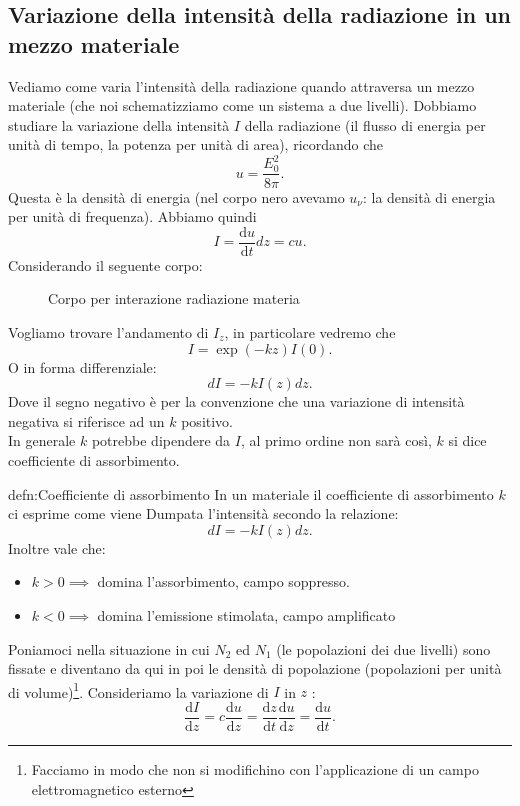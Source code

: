 \subsection{Variazione della intensità della radiazione in un mezzo materiale}%
Vediamo come varia l'intensità della radiazione quando attraversa un mezzo materiale (che noi schematizziamo come un sistema a due livelli). Dobbiamo studiare la variazione della intensità $I$  della radiazione (il flusso di energia per unità di tempo, la potenza per unità di area), ricordando che
\[
u = \frac{E_0^2}{8\pi}
.\] 
Questa è la densità di energia (nel corpo nero avevamo $u_\nu$: la densità di energia per unità di frequenza). Abbiamo quindi
\[
I= \frac{\text{d} u}{\text{d} t} dz =  cu
.\] 
Considerando il seguente corpo:
\begin{figure}[H]
    \centering
    \caption{Corpo per interazione radiazione materia}
    \label{fig:corpo-per-interazione-radiazione-materia}
\end{figure}
\noindent
Vogliamo trovare l'andamento di $I_z$, in particolare vedremo che
\[
    I=\exp\left(-kz\right)I(0) 
.\] 
O in forma differenziale:
\[
    dI = -k I(z)dz
.\] 
Dove il segno negativo è per la convenzione che una variazione di intensità negativa si riferisce ad un $k$  positivo.\\
In generale $k$  potrebbe dipendere da $I$, al primo ordine non sarà così, $k$  si dice coefficiente di assorbimento.
\begin{defn}{defn:Coefficiente di assorbimento}
In un materiale il coefficiente di assorbimento $k$ ci esprime come viene Dumpata l'intensità secondo la relazione:
\[
    dI=-kI(z) dz
.\] 
Inoltre vale che:
\begin{itemize}
    \item $k>0\implies$ domina l'assorbimento, campo soppresso.
    \item $k<0\implies$ domina l'emissione stimolata, campo amplificato
\end{itemize}
\end{defn}
Poniamoci nella situazione in cui $N_2$  ed $N_1$  (le popolazioni dei due livelli) sono fissate e diventano da qui in poi le densità di popolazione (popolazioni per unità di volume)\footnote{Facciamo in modo che non si modifichino con l'applicazione di un campo elettromagnetico esterno}.
Consideriamo la variazione di $I$  in $z$  :
\[
\frac{\text{d} I}{\text{d} z} = c \frac{\text{d} u}{\text{d} z} 
= \frac{\text{d} z}{\text{d} t} \frac{\text{d} u}{\text{d} z} = \frac{\text{d} u}{\text{d} t} 
.\]
